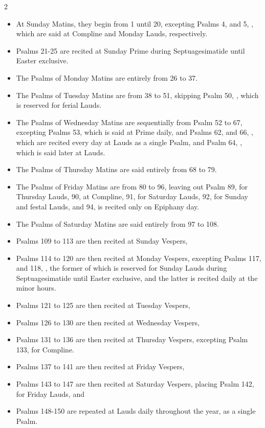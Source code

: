 \begin{multicols}{2}
\begin{itemize}[nosep,leftmargin=8pt]
	\item At Sunday Matins, they begin from 1 until 20, excepting Psalms 4,  and 5, , which are said at Compline and Monday Lauds, respectively.
	\item Psalms 21-25 are recited at Sunday Prime during Septuagesimatide until Easter exclusive.
	\item The Psalms of Monday Matins are entirely from 26 to 37.
	\item The Psalms of Tuesday Matins are from 38 to 51, skipping Psalm 50, , which is reserved for ferial Lauds.
	\item The Psalms of Wednesday Matins are sequentially from Psalm 52 to 67, excepting Psalms 53,  which is said at Prime daily, and Psalms 62,  and 66, , which are recited every day at Lauds as a single Psalm, and Psalm 64, , which is said later at Lauds.
	\item The Psalms of Thursday Matins are said entirely from 68 to 79.
	\item The Psalms of Friday Matins are from 80 to 96, leaving out Psalm 89,  for Thursday Lauds, 90,  at Compline, 91,  for Saturday Lauds, 92,  for Sunday and festal Lauds, and 94,  is recited only on Epiphany day.
	\item The Psalms of Saturday Matins are said entirely from 97 to 108.
	\item Psalms 109 to 113 are then recited at Sunday Vespers,
	\item Psalms 114 to 120 are then recited at Monday Vespers, excepting Psalms 117,  and 118, , the former of which is reserved for Sunday Lauds during Septuagesimatide until Easter exclusive, and the latter is recited daily at the minor hours.
	\item Psalms 121 to 125 are then recited at Tuesday Vespers,
	\item Psalms 126 to 130 are then recited at Wednesday Vespers,
	\item Psalms 131 to 136 are then recited at Thursday Vespers, excepting Psalm 133,  for Compline.
	\item Psalms 137 to 141 are then recited at Friday Vespers,
	\item Psalms 143 to 147 are then recited at Saturday Vespers, placing Psalm 142,  for Friday Lauds, and
	\item Psalms 148-150 are repeated at Lauds daily throughout the year, as a single Psalm.
\end{itemize}


\end{multicols}
